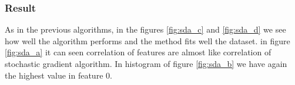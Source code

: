 \documentclass[a4paper,12pt,oneside,titlepage]{article}
\begin{document}
	\subsubsection{Result}		
	As in the previous algorithms, in the figures \ref{fig:sda_c} and \ref{fig:sda_d} we see how well the algorithm performs and the method fits well the dataset. in figure \ref{fig:sda_a} it can seen correlation of features are almost like correlation of stochastic gradient algorithm. In histogram of figure \ref{fig:sda_b} we have again the highest value in feature 0.
 	\begin{figure}[H]
		\centering
		\begin{center}
			\\

\end{center}
\end{figure}
\end{document}

